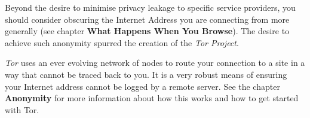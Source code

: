 Beyond the desire to minimise privacy leakage to specific service
providers, you should consider obscuring the Internet Address you are
connecting from more generally (see chapter \textbf{What Happens When
You Browse}). The desire to achieve such anonymity spurred the creation
of the \emph{Tor Project}.

\emph{Tor} uses an ever evolving network of nodes to route your
connection to a site in a way that cannot be traced back to you. It is a
very robust means of ensuring your Internet address cannot be logged by
a remote server. See the chapter \textbf{Anonymity} for more information
about how this works and how to get started with Tor.

